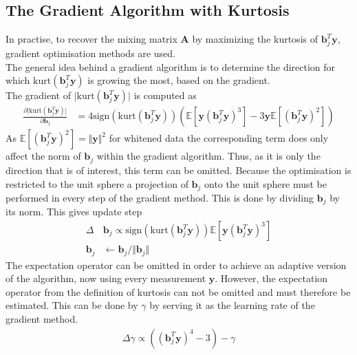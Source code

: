 \subsection{The Gradient Algorithm with Kurtosis}\label{sec:gra_kur}
In practise, to recover the mixing matrix $\textbf{A}$ by maximizing the kurtosis of $\textbf{b}_{j}^T \textbf{y}$, gradient optimisation methods are used.
\\
The general idea behind a gradient algorithm is to determine the direction for which $\text{kurt}(\textbf{b}_{j}^T \textbf{y})$ is growing the most, based on the gradient. 
\\
The gradient of $\vert \text{kurt}(\textbf{b}_{j}^T \textbf{y}) \vert$ is computed as
\begin{align}\label{eq:kurt}
\frac{\partial \vert \text{kurt}(\textbf{b}_{j}^T \textbf{y})\vert}{\partial \mathbf{b}_j} &= 4 \text{sign}(\text{kurt}(\textbf{b}_{j}^T \textbf{y})) (\mathbb{E}[\mathbf{y} (\textbf{b}_{j}^T \textbf{y})^3] - 3 \mathbf{y} \mathbb{E}[(\textbf{b}_{j}^T \textbf{y})^2]) 
\end{align} 
As $\mathbb{E}[(\textbf{b}_{j}^T \textbf{y})^2] =\Vert \mathbf{y} \Vert^2$ for whitened data the corresponding term does only affect the norm of $\textbf{b}_j$ within the gradient algorithm. 
Thus, as it is only the direction that is of interest, this term can be omitted. 
Because the optimisation is restricted to the unit sphere a projection of $\textbf{b}_j$ onto the unit sphere must be performed in every step of the gradient method. 
This is done by dividing $\textbf{b}_j$ by its norm. 
This gives update step 
\begin{align*}
\Delta &\textbf{b}_j \propto \text{sign}\left( \text{kurt}(\textbf{b}_{j}^T \textbf{y}) \right) \mathbb{E}[\textbf{y}(\textbf{b}_{j}^T \textbf{y})^3] \\
\textbf{b}_j &\leftarrow \textbf{b}_j/\Vert \textbf{b}_j \Vert
\end{align*}  
The expectation operator can be omitted in order to achieve an adaptive version of the algorithm, now using every measurement $\textbf{y}$. 
However, the expectation operator from the definition of kurtosis can not be omitted and must therefore be estimated. 
This can be done by $\gamma$ by serving it as the learning rate of the gradient method.
\begin{align*}
\Delta \gamma \propto((\textbf{b}_{j}^T \textbf{y})^4 - 3) - \gamma
\end{align*}

